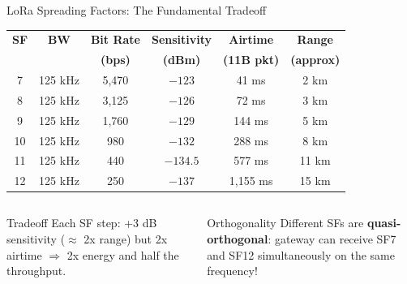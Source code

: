 \documentclass[aspectratio=169,11pt]{beamer}
\begin{document}
\begin{frame}{LoRa Spreading Factors: The Fundamental Tradeoff}
    \begin{center}
    \begin{tabular}{cccccc}
        \toprule
        \textbf{SF} & \textbf{BW} & \textbf{Bit Rate} & \textbf{Sensitivity} & \textbf{Airtime} & \textbf{Range} \\
        & & \textbf{(bps)} & \textbf{(dBm)} & \textbf{(11B pkt)} & \textbf{(approx)} \\
        \midrule
        7 & 125 kHz & 5,470 & $-123$ & 41 ms & 2 km \\
        8 & 125 kHz & 3,125 & $-126$ & 72 ms & 3 km \\
        9 & 125 kHz & 1,760 & $-129$ & 144 ms & 5 km \\
        10 & 125 kHz & 980 & $-132$ & 288 ms & 8 km \\
        11 & 125 kHz & 440 & $-134.5$ & 577 ms & 11 km \\
        12 & 125 kHz & 250 & $-137$ & 1,155 ms & 15 km \\
        \bottomrule
    \end{tabular}
    \end{center}
    
    \vspace{0.2cm}
    \begin{columns}
        \begin{alertblock}{Tradeoff}
            Each SF step: +3 dB sensitivity ($\approx$ 2x range) but 2x airtime $\Rightarrow$ 2x energy and half the throughput.
        \end{alertblock}
        
        \begin{exampleblock}{Orthogonality}
            Different SFs are \textbf{quasi-orthogonal}: gateway can receive SF7 and SF12 simultaneously on the same frequency!
        \end{exampleblock}
    \end{columns}
\end{frame}
\end{document}
